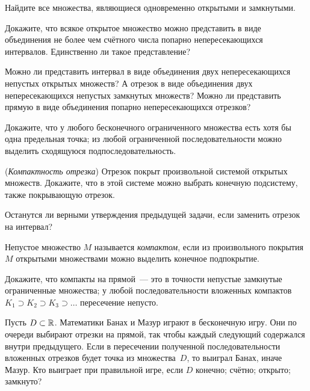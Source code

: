 \documentclass[a4paper, 11pt]{article}
\begin{document}
Найдите все множества, являющиеся одновременно открытыми и замкнутыми.

Докажите, что всякое открытое множество можно представить в виде
объединения не более чем счётного числа попарно непересекающихся интервалов.
Единственно ли такое представление?

Можно ли представить интервал в виде объединения двух
непересекающихся непустых открытых множеств?
А отрезок в виде объединения двух
непересекающихся непустых замкнутых множеств?
Можно ли представить прямую в виде объединения попарно непересекающихся
отрезков?

Докажите, что
у %
любого бесконечного ограниченного множества
есть хотя бы одна предельная точка;
из любой ограниченной последовательности можно выделить
сходящуюся подпоследовательность.

({\itshape Компактность отрезка})
Отрезок покрыт произвольной системой
открытых множеств.
Докажите, что в этой системе можно выбрать
конечную подсистему, также покрывающую отрезок.

Останутся ли верными утверждения предыдущей задачи, если заменить
отрезок на интервал?

Непустое множество $M$ называется {\itshape компактом},
если из произвольного покрытия $M$ открытыми множествами
можно выделить конечное подпокрытие.

Докажите, что
компакты на прямой~--- это в точности непустые
замкнутые ограниченные множества;
у любой последовательности вложенных компактов
$K_1\supset K_2\supset K_3\supset\dots$ %
пересечение непусто.


Пусть $D\subset\mathbb{R}$.
Математики Банах и Мазур играют в бесконечную игру.
Они по очереди выбирают отрезки на прямой,
так чтобы каждый следующий содержался внутри предыдущего. Если в
пересечении полученной последовательности вложенных отрезков
будет точка из множества~$D$, то выиграл Банах, иначе Мазур.
Кто выиграет при правильной игре, если $D$\hspace{2mm}
конечно;
счётно;
открыто;
замкнуто?



\end{document}
